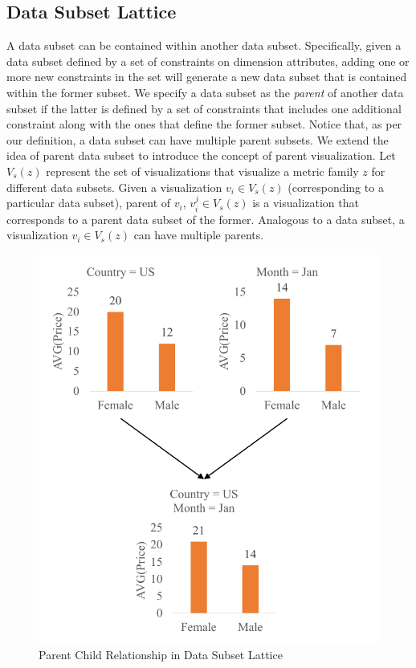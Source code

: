 \subsection{Data Subset Lattice}
A data subset can be contained within another data subset. Specifically, given a data subset defined by a set of constraints on dimension attributes, adding one or more new constraints in the set will generate a new data subset that is contained within the former subset. We specify a data subset as the \emph{parent} of another data subset if the latter is defined by a set of constraints that includes one additional constraint along with the ones that define the former subset. Notice that, as per our definition, a data subset can have multiple parent subsets.
 \newline
 \newline
We extend the idea of parent data subset to introduce the concept of parent visualization. Let $V_s(z)$ represent the set of visualizations that visualize a metric family $z$ for different data subsets. Given a visualization $v_i \in V_s(z)$ (corresponding to a particular data subset), parent of $v_i$, $v_i^j \in V_s(z)$ is a visualization that corresponds to a parent data subset of the former. Analogous to a data subset, a visualization $v_i \in V_s(z)$ can have multiple parents. 

\begin{figure}[bht]
\label{example}
\centering
\includegraphics[scale=0.75]{SubsetRelation.pdf}
\caption{Parent Child Relationship in Data Subset Lattice}
\end{figure}
 



